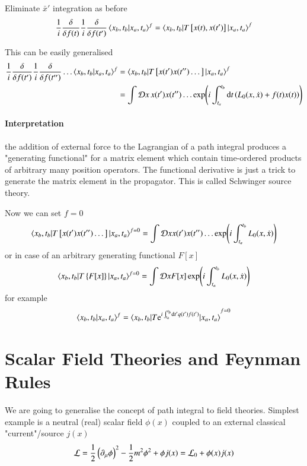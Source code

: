 Eliminate $\bar{x}'$ integration as before
\begin{align}
   \frac{1}{i} \frac{\delta}{\delta f(t)} \frac{1}{i} \frac{\delta}{\delta f(t')} \braket{x_b, t_b | x_a, t_a}^f  
   = \braket{x_b, t_b | T \left[x(t), x(t') \right] | x_a, t_a}^f
\end{align}

This can be easily generalised
\begin{align}
   \frac{1}{i} \frac{\delta}{\delta f(t')} \frac{1}{i} \frac{\delta}{\delta f(t'')} \dots \braket{x_b, t_b | x_a, t_a}^f 
   &= \braket{x_b, t_b | T \left[ x(t') x(t'') \dots  \right] |x_a, t_a}^f \\
   &= \int \mathcal{D} x \, x(t') x(t'') \dots \exp(i\int^{t_b}_{t_a} \dd{t} \left( L_0(x, \dot{x}) + f(t) x(t) \right))
\end{align}

\paragraph{Interpretation} the addition of external force to the Lagrangian of a path integral produces a "generating functional" for a matrix element which contain time-ordered products of arbitrary many position operators. The functional derivative is just a trick to generate the matrix element in the propagator. This is called Schwinger source theory.

Now we can set $f=0$
\begin{align}
   \braket{x_b, t_b | T \left[ x(t') x(t'') \dots  \right] |x_a, t_a}^{f=0}
   = \int \mathcal{D} x x(t') x(t'') \dots \exp(i\int^{t_b}_{t_a}  L_0(x, \dot{x}) )
\end{align}
or in case of an arbitrary generating functional $F[x]$ 
\begin{align}
   \braket{x_b, t_b | T \left\{ F[x]  \right\} |x_a, t_a}^{f=0}
   = \int \mathcal{D} x F[x] \exp(i\int^{t_b}_{t_a}  L_0(x, \dot{x}) )
\end{align}
for example
\begin{align*}
   \braket{x_b, t_b | x_a, t_a}^f = \braket{ x_b, t_b | T \mathrm{e}^{i\int^{t_b}_{t_a} \dd{t'} q(t') f(t')} | x_a, t_a}^{f=0}
\end{align*}

\section{Scalar Field Theories and Feynman Rules}
We are going to generalise the concept of path integral to field theories. Simplest example is a neutral (real) scalar field $\phi(x)$ coupled to an external classical "current"/source $j(x)$
\begin{align}
   \mathcal{L} = \frac{1}{2} \left( \partial_\mu \phi \right)^2 - \frac{1}{2} m^2 \phi^2 + \phi j(x) = \mathcal{L}_0 + \phi(x) j(x)
\end{align}

